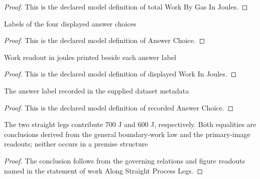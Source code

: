 \begin{proof}
  This is the declared model definition of total Work By Gas In Joules.
\end{proof}
\begin{definition}
  \label{def:physics:phyx-mini-0358:phyxminiproblems-problemphyxmini0358-answerchoice}
  Labels of the four displayed answer choices
\end{definition}
\begin{proof}
  This is the declared model definition of Answer Choice.
\end{proof}
\begin{definition}
  \label{def:physics:phyx-mini-0358:phyxminiproblems-problemphyxmini0358-displayedworkinjoules}
  Work readout in joules printed beside each answer label
\end{definition}
\begin{proof}
  This is the declared model definition of displayed Work In Joules.
\end{proof}
\begin{definition}
  \label{def:physics:phyx-mini-0358:phyxminiproblems-problemphyxmini0358-recordedanswerchoice}
  The answer label recorded in the supplied dataset metadata
\end{definition}
\begin{proof}
  This is the declared model definition of recorded Answer Choice.
\end{proof}
\begin{lemma}
  \label{lem:physics:phyx-mini-0358:phyxminiproblems-problemphyxmini0358-workalongstraightprocesslegs}
  The two straight legs contribute 700 J and 600 J, respectively. Both equalities are conclusions derived from the general boundary-work law and the primary-image readouts; neither occurs in a premise structure
\end{lemma}
\begin{proof}
  The conclusion follows from the governing relations and figure readouts named in the statement of work Along Straight Process Legs.
\end{proof}
